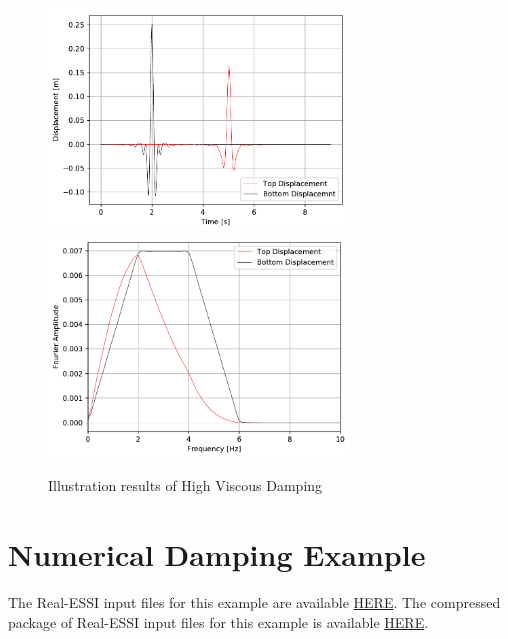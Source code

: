 \begin{figure}[H]
  \centering
  \includegraphics[width = 8cm]{./Figure-files/Day3/Viscous_nonlinear_behavior/Rayleigh002Displacement.pdf}
  \includegraphics[width = 8cm]{./Figure-files/Day3/Viscous_nonlinear_behavior/Rayleigh002Displacement_Spectrum.pdf}
  \caption{Illustration results of High Viscous Damping}
  \label{fig_day3_viscous_damping_high}
\end{figure}




\clearpage
\newpage
\section{ Numerical Damping Example }
\label{Numerical_Damping_Example}

The Real-ESSI input files for this example are available 
\href{https://github.com/yuan-energy/Real-ESSI-Short-Course-Examples/tree/master/short-course-examples/Day3/Numerical_Damping_Example/newmark}{HERE}. 
The compressed package of Real-ESSI input files for this example is available 
\href{https://github.com/yuan-energy/Real-ESSI-Short-Course-Examples/blob/master/short-course-examples/Day3/Numerical_Damping_Example/newmark/newmark.tgz?raw=true}{HERE}. 


